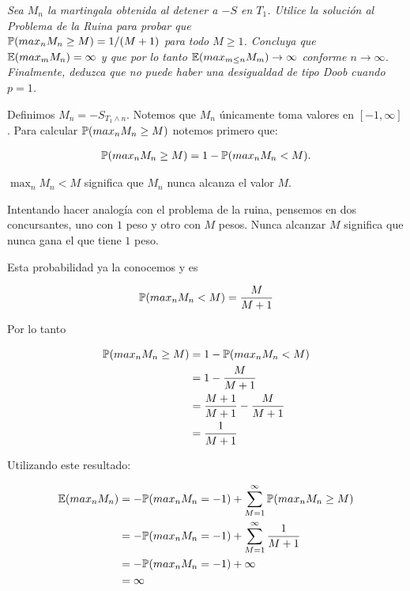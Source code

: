 \emph{
	Sea $M_n$ la martingala obtenida al detener a $-S$ en $T_1$. Utilice la solución al
	Problema de la Ruina para probar que \\
	$\mathbb{P}(max_n M_n \geq M) = 1/(M+1)$ para todo $M \geq 1$. Concluya que\\
	$\mathbb{E}(max_m M_n) = \infty$ y que por lo tanto $\mathbb{E}(max_{m\leq n} M_m) \rightarrow \infty$ conforme 
	$n \rightarrow \infty$. Finalmente, deduzca que no puede haber una desigualdad de tipo Doob cuando $p=1$.
}\par\null
	
\afterstatement

	Definimos $M_n = -S_{T_1 \wedge n}$. Notemos que $M_n$ únicamente toma valores en $[-1, \infty]$.
	Para calcular $\mathbb{P}(max_n M_n \geq M)$ notemos primero que:

	\begin{align}
		\mathbb{P}(max_n M_n \geq M) = 1 - \mathbb{P}(max_n M_n < M).
	\end{align}\par\null
	
	$\max_n M_n < M$ significa que $M_n$ nunca alcanza el valor $M$.\par\null
	 
	Intentando hacer analogía con el problema de la ruina, pensemos en dos concursantes,
	uno con $1$ peso y otro con $M$ pesos. Nunca alcanzar $M$ significa que nunca gana el que tiene $1$ peso.\par\null
	
	Esta probabilidad ya la conocemos y es 
	
	\begin{align}
		\mathbb{P}(max_n M_n < M) = \frac{M}{M + 1}
	\end{align}\par\null
		
	Por lo tanto
	
	\begin{align}
		\mathbb{P}(max_n M_n \geq M) 	&= 1 - \mathbb{P}(max_n M_n < M) \\
								&= 1 - \frac{M}{M + 1}\\
								&= \frac{M+1}{M+1} - \frac{M}{M + 1}\\
								&= \frac{1}{M+1}
	\end{align}\par\null
	
	Utilizando este resultado:

	\begin{align} \label{problema1_3:esperanza_del_maximo_de_M_n}
		\mathbb{E}(max_n M_n) 	&= - \mathbb{P}(max_n M_n = -1) + \sum_{M=1}^{\infty} \mathbb{P}(max_n M_n \geq M) \\
						&= - \mathbb{P}(max_n M_n = -1) + \sum_{M=1}^{\infty} \frac{1}{M+1} \\ 
						&= - \mathbb{P}(max_n M_n = -1) + \infty \\
						&= \infty
	\end{align}\par\null						
	
